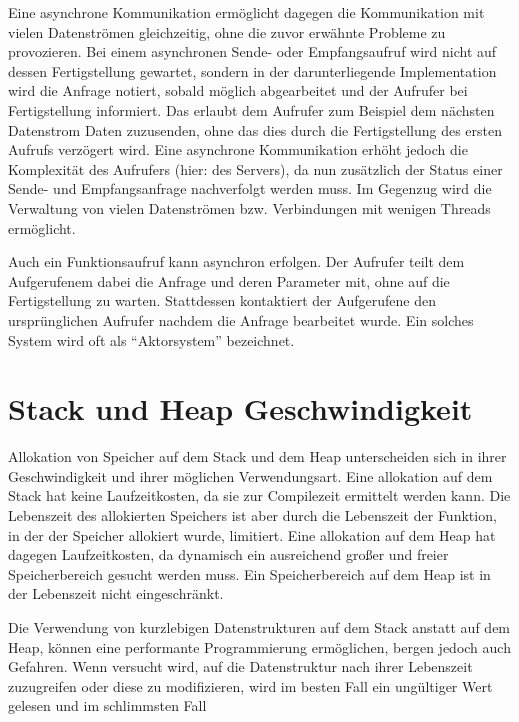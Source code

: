 Eine asynchrone Kommunikation ermöglicht dagegen die Kommunikation mit vielen Datenströmen gleichzeitig, ohne die zuvor erwähnte Probleme zu provozieren.
Bei einem asynchronen Sende- oder Empfangsaufruf wird nicht auf dessen Fertigstellung gewartet, sondern in der darunterliegende Implementation wird die Anfrage notiert, sobald möglich abgearbeitet und der Aufrufer bei Fertigstellung informiert.
Das erlaubt dem Aufrufer zum Beispiel dem nächsten Datenstrom Daten zuzusenden, ohne das dies durch die Fertigstellung des ersten Aufrufs verzögert wird.
Eine asynchrone Kommunikation erhöht jedoch die Komplexität des Aufrufers (hier: des Servers), da nun zusätzlich der Status einer Sende- und Empfangsanfrage nachverfolgt werden muss.
Im Gegenzug wird die Verwaltung von vielen Datenströmen bzw. Verbindungen mit wenigen Threads ermöglicht.

Auch ein Funktionsaufruf kann asynchron erfolgen.
Der Aufrufer teilt dem Aufgerufenem dabei die Anfrage und deren Parameter mit, ohne auf die Fertigstellung zu warten.
Stattdessen kontaktiert der Aufgerufene den ursprünglichen Aufrufer nachdem die Anfrage bearbeitet wurde.
Ein solches System wird oft als \enquote{Aktorsystem} bezeichnet.

\section{Stack und Heap Geschwindigkeit}


Allokation von Speicher auf dem Stack und dem Heap unterscheiden sich in ihrer Geschwindigkeit und ihrer möglichen Verwendungsart.
Eine allokation auf dem Stack hat keine Laufzeitkosten, da sie zur Compilezeit ermittelt werden kann.
Die Lebenszeit des allokierten Speichers ist aber durch die Lebenszeit der Funktion, in der der Speicher allokiert wurde, limitiert.
Eine allokation auf dem Heap hat dagegen Laufzeitkosten, da dynamisch ein ausreichend großer und freier Speicherbereich gesucht werden muss.
Ein Speicherbereich auf dem Heap ist in der Lebenszeit nicht eingeschränkt.

Die Verwendung von kurzlebigen Datenstrukturen auf dem Stack anstatt auf dem Heap, können eine performante Programmierung ermöglichen, bergen jedoch auch Gefahren.
Wenn versucht wird, auf die Datenstruktur nach ihrer Lebenszeit zuzugreifen oder diese zu modifizieren, wird im besten Fall ein ungültiger Wert gelesen und im schlimmsten Fall 

